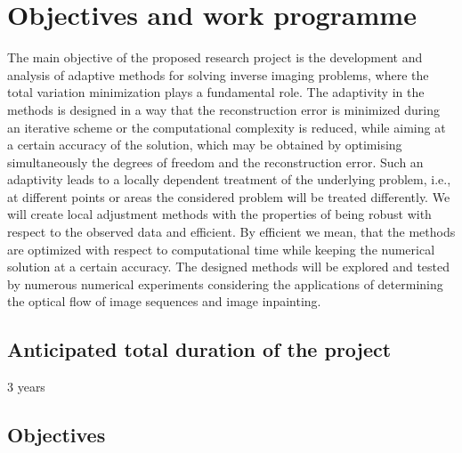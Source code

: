 \documentclass[enabledeprecatedfontcommands,cleardoublepage=empty,headsepline,twoside,11pt,DIV=15,BCOR=12mm,final]{scrartcl}
\newcommand{\newf}[1]{}%
\begin{document}
\section{Objectives and work programme}
\label{sec:object}
The main objective of the proposed research project is the development and analysis of adaptive methods for solving inverse imaging problems, where the total variation minimization plays a fundamental role. The adaptivity in the methods is designed in a way that the reconstruction error is minimized during an iterative scheme or the computational complexity is reduced, while aiming at a certain accuracy of the solution, which may be obtained by optimising simultaneously the degrees of freedom and the reconstruction error. Such an adaptivity leads to a locally dependent treatment of the underlying problem, i.e., at different points or areas the considered problem will be treated differently. We will create local adjustment methods with the properties of being robust with respect to the observed data and efficient. By efficient we mean, that the methods are optimized with respect to computational time while keeping the numerical solution at a certain accuracy. %
%
  The designed methods will be explored and tested by numerous numerical experiments considering the applications of determining the optical flow of image sequences %
  and image inpainting. %


\subsection{Anticipated total duration of the project}
\label{sec:duration}

3 years

\subsection{Objectives}\label{sec:Objectives}
\end{document}
